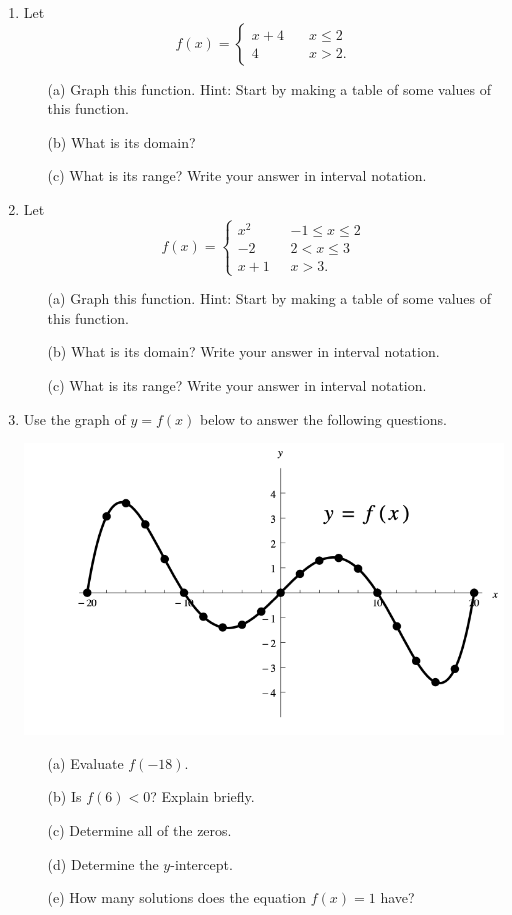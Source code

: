 \documentclass[12pt]{amsart}
\begin{document}
\begin{enumerate}
\item Let $$f(x) = \begin{cases}  x+4 \quad & x \leq 2 \\ 4 & x > 2. \end{cases}$$ 
\begin{itemize}
\item[(a)] Graph this function. Hint: Start by making a table of some values of this function.
\item[(b)] What is its domain?
\item[(c)] What is its range? Write your answer in interval notation.
\end{itemize}

\item Let $$f(x) = \begin{cases}  x^2 \qquad & -1 \leq x \leq 2 \\ -2 & 2< x\leq 3 \\ x+1 & x > 3. \end{cases}$$ 
\begin{itemize}
\item[(a)] Graph this function. Hint: Start by making a table of some values of this function.
\item[(b)] What is its domain? Write your answer in interval notation.
\item[(c)] What is its range? Write your answer in interval notation.
\end{itemize}
\eject

\item Use the graph of $y = f(x)$ below to answer the following questions.

\includegraphics[scale=.7]{graph_for_problem_3.png}

\begin{itemize}
\item[(a)] Evaluate $f(-18)$.
\item[(b)] Is $f(6) < 0$? Explain briefly.
\item[(c)] Determine all of the zeros.
\item[(d)] Determine the $y$-intercept. 
\item[(e)] How many solutions does the equation $f(x) = 1$ have?
\end{itemize}


\end{enumerate}
\end{document}

